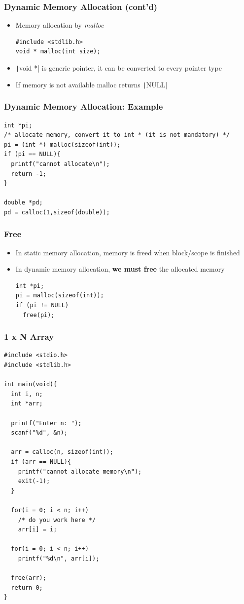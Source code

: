 \documentclass{../c-lecture}
\begin{document}
\begin{frame}[fragile]
  \frametitle{Dynamic Memory Allocation (cont’d)}
  \begin{itemize}
    \item Memory allocation by \textit{\color{YellowOrange} malloc}
    \begin{verbatim}
#include <stdlib.h>
void * malloc(int size);
    \end{verbatim}
    \item
      \texttt|void *| is generic pointer, it can be
      converted to every pointer type

    \item If memory is not available malloc returns \texttt|NULL|
  \end{itemize}
\end{frame}

\begin{frame}[fragile]
  \frametitle{Dynamic Memory Allocation: Example}
  \begin{verbatim}
int *pi;
/* allocate memory, convert it to int * (it is not mandatory) */
pi = (int *) malloc(sizeof(int));
if (pi == NULL){
  printf("cannot allocate\n");
  return -1;
}

double *pd;
pd = calloc(1,sizeof(double));
  \end{verbatim}
\end{frame}

\begin{frame}[fragile]
  \frametitle{Free}
  \begin{itemize}
    \item
      In static memory allocation, memory is freed when block/scope is finished
    \item
      In dynamic memory allocation,
      \textbf{\color{Orange} we must free} the allocated memory
    \begin{verbatim}
int *pi;
pi = malloc(sizeof(int));
if (pi != NULL)
  free(pi);
    \end{verbatim}
  \end{itemize}
\end{frame}

\begin{frame}[fragile]
  \frametitle{1 x N Array}
  \tiny
  \begin{verbatim}
#include <stdio.h>
#include <stdlib.h>

int main(void){
  int i, n;
  int *arr;

  printf("Enter n: ");
  scanf("%d", &n);

  arr = calloc(n, sizeof(int));
  if (arr == NULL){
    printf("cannot allocate memory\n");
    exit(-1);
  }

  for(i = 0; i < n; i++)
    /* do you work here */
    arr[i] = i;

  for(i = 0; i < n; i++)
    printf("%d\n", arr[i]);

  free(arr);
  return 0;
}
  \end{verbatim}
\end{frame}
\end{document}
